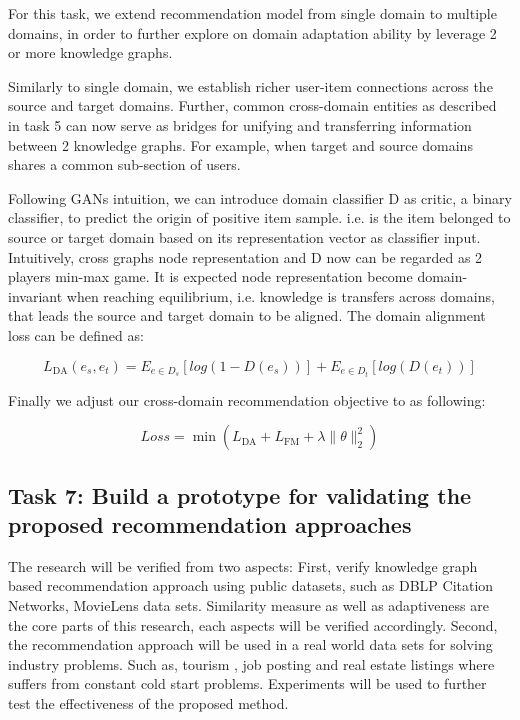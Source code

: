For this task, we extend recommendation model from single domain to multiple domains, in order to further explore on domain adaptation ability by leverage 2 or more knowledge graphs.

Similarly to single domain, we establish richer user-item connections across the source and target domains. Further, common cross-domain entities as described in task 5 can now serve as bridges for unifying and transferring information between 2 knowledge graphs.
For example, when target and source domains shares a common sub-section of users.

Following GANs intuition, we can introduce domain classifier D as critic, a binary classifier, to predict the origin of positive item sample. i.e. is the item belonged to source or target domain based on its representation vector as classifier input. Intuitively, cross graphs node representation and D now can be regarded as 2 players min-max game. It is expected node representation become domain-invariant when reaching equilibrium, i.e. knowledge is transfers across domains, that leads the source and target domain to be aligned. The domain alignment loss can be defined as:

\begin{equation}
    L_\text{DA}(e_s,e_t)=E_{e \in D_s}[log(1-D(e_s))] + E_{e \in D_t}[log(D(e_t))]
\end{equation}

Finally we adjust our cross-domain recommendation objective to as following:

\begin{equation}
    Loss=\min{(L_\text{DA}+L_\text{FM}+\lambda\|\theta\|^2_2)}
\end{equation}



\subsection*{Task 7: Build a prototype for validating the proposed recommendation approaches}

The research will be verified from two aspects:
First, verify knowledge graph based recommendation approach using public datasets, such as DBLP Citation Networks, MovieLens data sets. Similarity measure as well as adaptiveness are the core parts of this research, each aspects will be verified accordingly.
Second, the recommendation approach will be used in a real world data sets for solving industry problems. Such as, tourism , job posting and real estate listings where suffers from constant cold start problems. Experiments will be used to further test the effectiveness of the proposed method.

